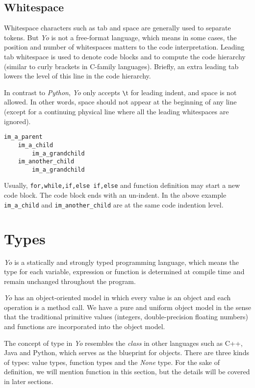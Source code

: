 \documentclass[11pt]{article}
\begin{document}
\subsection{Whitespace} %
Whitespace characters such as tab and space are generally used to separate tokens. But \textit{Yo} is not a free-format language, which means in some cases, the position and number of whitespaces matters to the code interpretation. Leading tab whitespace is used to denote code blocks and to compute the code hierarchy (similar to curly brackets in C-family languages). Briefly, an extra leading tab lowers the level of this line in the code hierarchy.%

In contrast to \textit{Python}, \textit{Yo} only accepts \texttt{\textbackslash}t for leading indent, and space is not allowed. In other words, space should not appear at the beginning of any line (except for a continuing physical line where all the leading whitespaces are ignored).\\
\begin{lstlisting}
im_a_parent
	im_a_child
		im_a_grandchild
	im_another_child
		im_a_grandchild
\end{lstlisting}

Usually, \texttt{for,while,if,else if,else} and function definition may start a new code block. The code block ends with an un-indent. In the above example \texttt{im\_a\_child} and \texttt{im\_another\_child} are at the same code indention level.


\section{Types}
\textit{Yo} is a statically and strongly typed programming language, which means the type for each variable, expression or function is determined at compile time and remain unchanged throughout the program.

\textit{Yo} has an object-oriented model in which every value is an object and each operation is a method call. We have a pure and uniform object model in the sense that the traditional primitive values (integers, double-precision floating numbers) and functions are incorporated into the object model.

The concept of type in \textit{Yo} resembles the \textit{class} in other languages such as C++, Java and Python, which serves as the blueprint for objects. There are three kinds of types: value types, function types and the \textit{None} type. For the sake of definition, we will mention function in this section, but the details will be covered in later sections.
\end{document}
